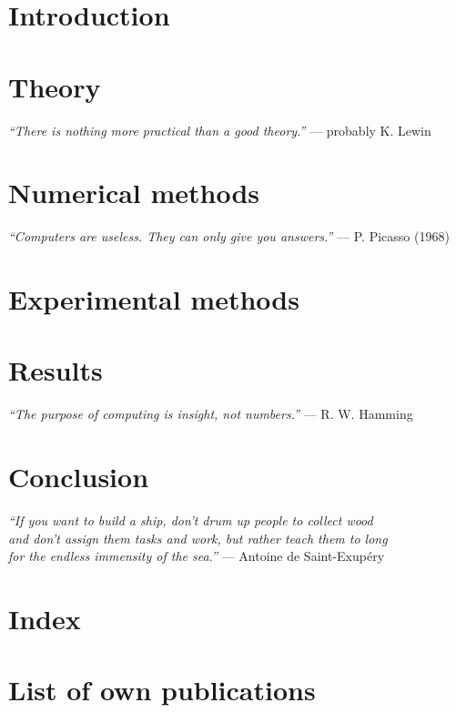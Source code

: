 \documentclass[a4paper,12pt]{report}
\begin{document}

\tableofcontents

\chapter{Introduction}


\chapter{Theory} 
\begin{flushright}  \textit{``There is nothing more practical than a good theory.''} --- probably K. Lewin \end{flushright}


\chapter{Numerical methods} 
\begin{flushright}  \textit{``Computers are useless. They can only give you answers.''} --- P. Picasso (1968) \end{flushright}


\chapter{Experimental methods}


\chapter{Results}
\begin{flushright} \textit{``The purpose of computing is insight, not numbers.''} --- R. W. Hamming \end{flushright}


\chapter{Conclusion}
\begin{flushright} \textit{``If you want to build a ship, don't drum up people to collect wood \\and don't assign them tasks and work, but rather teach them to long \\for the endless immensity of the sea.''} --- Antoine de Saint-Exup\'{e}ry \end{flushright}


\label{endtext} 

\printbibliography

\chapter*{Index}
\printindex

\chapter*{List of own publications}

\label{enddocument} 
\end{document}
